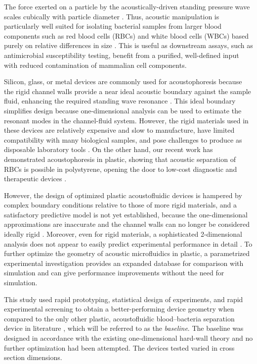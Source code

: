 The force exerted on a particle by the acoustically-driven standing pressure wave scales cubically with particle diameter \cite{settnes2012forces}. Thus, acoustic manipulation is particularly well suited for isolating bacterial samples from larger blood components such as red blood cells (RBCs) and white blood cells (WBCs) based purely on relative differences in size \cite{ohlsson2016integrated}\cite{li2016acoustofluidic}. This is useful as downstream assays, such as antimicrobial susceptibility testing, benefit from a purified, well-defined input with reduced contamination of mammalian cell components.

Silicon, glass, or metal devices are commonly used for acoustophoresis because the rigid channel walls provide a near ideal acoustic boundary against the sample fluid, enhancing the required standing wave resonance \cite{barnkob2009acoustofluidics}\cite{hill2008modelling}. This ideal boundary simplifies design because one-dimensional analysis can be used to estimate the resonant modes in the channel-fluid system. However, the rigid materials used in these devices are relatively expensive and slow to manufacture, have limited compatibility with many biological samples, and pose challenges to produce as disposable laboratory tools \cite{nge2013advances}.  On the other hand, our recent work has demonstrated acoustophoresis in plastic, showing that acoustic separation of RBCs is possible in polystyrene, opening the door to low-cost diagnostic and therapeutic devices \cite{mueller2013continuous}.


However, the design of optimized plastic acoustofluidic devices is hampered by complex boundary conditions relative to those of more rigid materials, and a satisfactory predictive model is not yet established, because the one-dimensional approximations are inaccurate and the channel walls can no longer be considered ideally rigid \cite{mueller2013continuous}.  Moreover, even for rigid materials, a sophisticated 2-dimensional analysis does not appear to easily predict experimental performance in detail \cite{garofalo2016performance}\cite{bora2015efficient}. To further optimize the geometry of acoustic microfluidics in plastic, a parametrized experimental investigation provides an expanded database for comparison with simulation and can give performance improvements without the need for simulation.  

This study used rapid prototyping, statistical design of experiments, and rapid experimental screening to obtain a better-performing device geometry when compared to the only other plastic, acoustofluidic blood--bacteria separation device in literature \cite{mueller2013continuous}, which will be referred to as the \textit{baseline}. The baseline was designed in accordance with the existing one-dimensional hard-wall theory and no further optimization had been attempted. The devices tested varied in cross section dimensions. 

